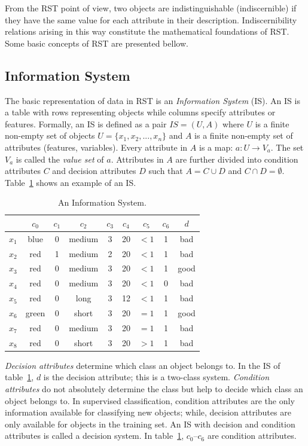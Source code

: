 \documentclass[number,preprint,review,12pt]{elsarticle}
\begin{document}
  From the RST point of view, two objects are indistinguishable (indiscernible) if they have the same value for each attribute in their description. Indiscernibility relations arising in this way constitute the mathematical foundations of RST. Some basic concepts of RST are presented bellow.
  
\subsection{Information System}
  The basic representation of data in RST is an \emph{Information System} (IS). An IS is a table with rows
  representing objects while columns specify attributes or features. Formally, an IS is defined as a pair
  $IS=(U,A)$ where $U$ is a finite non-empty set of objects $U=\lbrace x_1,x_2,...,x_n\rbrace$ and $A$ is a 
  finite non-empty set
  of attributes (features, variables). Every attribute in $A$ is a map: $a: U \rightarrow V_a$. The set $V_a$ is
  called the \textit{value set} of $a$. Attributes in $A$ are further divided into condition attributes $C$ and 
  decision attributes $D$ such that $A=C \cup D$ and $C \cap D =\emptyset$. 
  Table~\ref{tab_IS} shows an example of an IS.
  
 \begin{table}[htb]
		\caption{An Information System.} \label{tab_IS}
		\centering
 	\begin{tabular}{c||c|c|c|c|c|c|c||c}
 			  & $c_0$ & $c_1$ & $c_2$ &  $c_3$ & $c_4$ & $c_5$ &  $c_6$ & $d$ \\
 		\hline \hline
		$x_1$ &   blue  & 0 & medium & 3 & 20 & $<1$  & 1 & bad   \\
		$x_2$ &   red   & 1 & medium & 2 & 20 & $<1$  & 1 & bad   \\
		$x_3$ &   red   & 0 & medium & 3 & 20 & $<1$  & 1 & good   \\
		$x_4$ &   red   & 0 & medium & 3 & 20 & $<1$  & 0 & bad   \\
		$x_5$ &   red   & 0 & long   & 3 & 12 & $<1$  & 1 & bad   \\
		$x_6$ &   green & 0 & short  & 3 & 20 & $=1$  & 1 & good   \\
		$x_7$ &   red   & 0 & medium & 3 & 20 & $=1$  & 1 & bad   \\
		$x_8$ &   red   & 0 & short  & 3 & 20 & $>1$  & 1 & bad   \\
 	\end{tabular}             
 \end{table}
 
  \textit{Decision attributes} determine which class an object belongs to. In the IS of table~\ref{tab_IS}, $d$ is the decision attribute; this is a two-class system. \textit{Condition attributes} do not absolutely determine the class but help to decide which class an object belongs to. In supervised classification, condition attributes are the only information available for classifying new objects; while, decision attributes are only available for objects in the training set. An IS with decision and condition attributes is called a decision system. In table~\ref{tab_IS}, $c_0$--$c_6$ are condition attributes.
  
\end{document}
